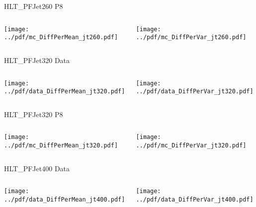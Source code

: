 \documentclass[9pt]{beamer}
\begin{document}
\begin{frame}[t]{HLT\_PFJet260 P8}
\begin{columns}[T]
  \begin{column}{.5\textwidth}
  \texttt{[image: ../pdf/mc\_DiffPerMean\_jt260.pdf]}
  \end{column}
  \begin{column}{.5\textwidth}
  \texttt{[image: ../pdf/mc\_DiffPerVar\_jt260.pdf]}
  \end{column}
\end{columns}
\end{frame}

\begin{frame}[t]{HLT\_PFJet320 Data}
\begin{columns}[T]
  \begin{column}{.5\textwidth}
  \texttt{[image: ../pdf/data\_DiffPerMean\_jt320.pdf]}
  \end{column}
  \begin{column}{.5\textwidth}
  \texttt{[image: ../pdf/data\_DiffPerVar\_jt320.pdf]}
  \end{column}
\end{columns}
\end{frame}

\begin{frame}[t]{HLT\_PFJet320 P8}
\begin{columns}[T]
  \begin{column}{.5\textwidth}
  \texttt{[image: ../pdf/mc\_DiffPerMean\_jt320.pdf]}
  \end{column}
  \begin{column}{.5\textwidth}
  \texttt{[image: ../pdf/mc\_DiffPerVar\_jt320.pdf]}
  \end{column}
\end{columns}
\end{frame}

\begin{frame}[t]{HLT\_PFJet400 Data}
\begin{columns}[T]
  \begin{column}{.5\textwidth}
  \texttt{[image: ../pdf/data\_DiffPerMean\_jt400.pdf]}
  \end{column}
  \begin{column}{.5\textwidth}
  \texttt{[image: ../pdf/data\_DiffPerVar\_jt400.pdf]}
  \end{column}
\end{columns}
\end{frame}
\end{document}
